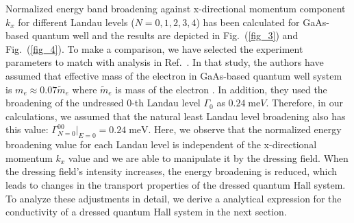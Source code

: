 Normalized energy band broadening against x-directional momentum component ${k_x}$ for different Landau levels ($N = 0,1,2,3,4$) has been calculated for GaAs-based quantum well and the results are depicted in Fig.~(\ref{fig_3}) and Fig.~(\ref{fig_4}). To make a comparison, we have selected the experiment parameters to match with analysis in Ref.~\cite{endo09}.
In that study, the authors have assumed that effective mass of the electron in GaAs-based quantum well system is $m_e \approx 0.07\tilde{m}_e$ where $\tilde{m}_e$ is mass of the electron \cite{endo09,winkler03,wackerl20}. In addition, they used the broadening of the undressed $0$-th Landau level $\Gamma_0$ as $0.24\;\text{me}V$. Therefore, in our calculations, we assumed that the natural least Landau level broadening also has this value: $\Gamma^{00}_{N=0}|_{E=0} = 0.24 \;\text{meV}$.
Here, we observe that the normalized energy broadening value for each Landau level is independent of the x-directional momentum $k_x$ value and we are able to manipulate it by the dressing field. When the dressing field's intensity increases, the energy broadening is reduced, which leads to changes in the transport properties of the dressed quantum Hall system.
To analyze these adjustments in detail, we derive a analytical expression for the conductivity of a dressed quantum Hall system in the next section.
